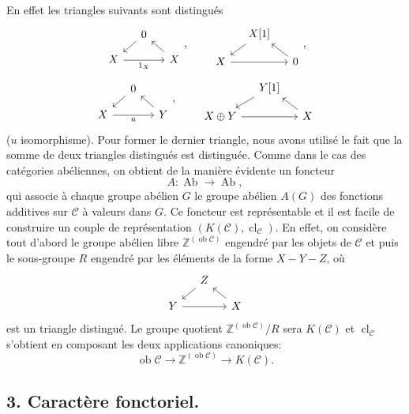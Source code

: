 \documentclass[11pt]{article}
\providecommand{\Ob}{\operatorname{ob}}
\providecommand{\cC}{\mathcal C}
\providecommand{\Ob}{\operatorname{ob}}
\providecommand{\Ab}{\operatorname{Ab}}
\providecommand{\cC}{\mathcal C}
\providecommand{\Ab}{\operatorname{Ab}}
\providecommand{\Ob}{\operatorname{Ob}}
\providecommand{\Ob}{\operatorname{ob}}
\providecommand{\Ob}{\operatorname{Ob}}
\begin{document}
En
effet les triangles suivants sont distingués
\[
\begin{tikzcd}[column sep=small,row sep=small]
&0 \arrow[dl]\\ X \arrow[rr,"1_X"']&&X\arrow[ul]
\end{tikzcd},
\qquad
\begin{tikzcd}[column sep=small,row sep=small]
&X[1]\arrow[dl]\\ X\arrow[rr]&&0\arrow[ul]
\end{tikzcd},
\]
\[
\begin{tikzcd}[column sep=small,row sep=small]
&0\arrow[dl]\\ X\arrow[rr,"u"']&&Y\arrow[ul]
\end{tikzcd},
\qquad
\begin{tikzcd}[column sep=small,row sep=small]
&Y[1]\arrow[dl]\\ X\oplus Y\arrow[rr]&&X\arrow[ul]
\end{tikzcd}
\]
($u$ isomorphisme). Pour former le dernier triangle, nous avons utilisé le fait que la somme de deux triangles distingués est distinguée. Comme dans le cas des catégories abéliennes, on obtient de la manière évidente un foncteur
\[
A:\Ab\longrightarrow\Ab,
\]
qui associe à chaque groupe abélien $G$ le groupe abélien $A(G)$ des fonctions additives sur $\cC$ à valeurs dans $G$. Ce foncteur est représentable et il est facile de construire un couple de représentation $(K(\cC),\operatorname{cl}_{\cC})$. En effet, on considère tout d'abord le groupe abélien libre $\mathbb Z^{(\Ob\cC)}$ engendré par les objets de $\cC$ et puis le sous-groupe $R$ engendré par les éléments de la forme $X-Y-Z$, où
\[
\begin{tikzcd}[column sep=small,row sep=small]
&Z\arrow[dl]\\ Y\arrow[rr]&&X\arrow[ul]
\end{tikzcd}
\]
est un triangle distingué. Le groupe quotient $\mathbb Z^{(\Ob\cC)}/R$ sera $K(\cC)$ et $\operatorname{cl}_{\cC}$ s'obtient en composant les deux applications canoniques:
\[
\Ob\cC\longrightarrow \mathbb Z^{(\Ob\cC)}\longrightarrow K(\cC).
\]

\subsection*{3. Caractère fonctoriel.}
\end{document}

